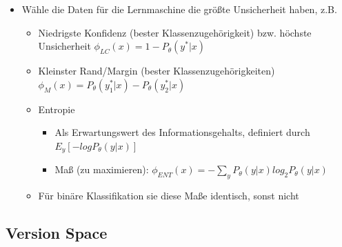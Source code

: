 \documentclass[paper=a4, fontsize=11pt]{scrartcl} %
\numberwithin{equation}{section} %
\numberwithin{figure}{section} %
\numberwithin{table}{section} %
\begin{document}
\begin{itemize}
\item Wähle die Daten für die Lernmaschine die größte Unsicherheit haben, z.B.
\begin{itemize}
\item Niedrigste Konfidenz (bester Klassenzugehörigkeit) bzw. höchste Unsicherheit $\phi_{LC}(x) = 1 - P_\theta(y^*|x)$
\item Kleinster Rand/Margin (bester Klassenzugehörigkeiten) $\phi_M(x) = P_\theta(y_1^*|x) - P_\theta(y_2^*|x)$
\item Entropie
\begin{itemize}
\item Als Erwartungswert des Informationsgehalts, definiert durch $E_y[-log P_\theta(y|x)]$
\item Maß (zu maximieren): $\phi_{ENT}(x) = - \sum\limits_y P_\theta(y|x) log_2 P_\theta(y|x)$
\end{itemize}
\item Für binäre Klassifikation sie diese Maße identisch, sonst nicht
\end{itemize}
\end{itemize}

\subsection{Version Space}
\end{document}
